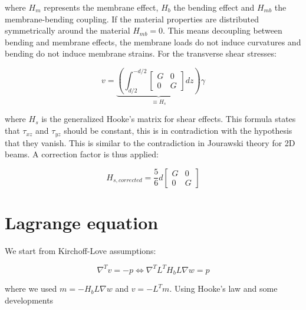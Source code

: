 	where $H_m$ represents the membrane effect, $H_b$ the bending effect and $H_{mb}$ the membrane-bending coupling. If the material properties are distributed symmetrically around the material $H_{mb} = 0$. This means decoupling between bending and membrane effects, the membrane loads do not induce curvatures and bending do not induce membrane strains. For the transverse shear stresses: 
	
	\begin{equation}
	v =\underbrace{\left( \int _{d/2} ^{-d/2} \left[
	\begin{array}{cc}
	G & 0\\
	0 & G
	\end{array}
	\right] dz\right)}_{\equiv H_s} \gamma
	\end{equation}
	
	where $H_s$ is the generalized Hooke's matrix for shear effects. This formula states that $\tau _{xz}$ and $\tau _{yz}$ should be constant, this is in contradiction with the hypothesis that they vanish. This is similar to the contradiction in Jourawski theory for 2D beams. A correction factor is thus applied: 
	
	\begin{equation}
	H_{s,corrected} = \frac{5}{6} d \left[
	\begin{array}{cc}
	G & 0\\
	0 & G
	\end{array}
	\right]
	\end{equation}
	
	\begin{center}
	\end{center}
	
\section{Lagrange equation}
	We start from Kirchoff-Love assumptions: 
	
	\begin{equation}
	\nabla ^T v = -p \Leftrightarrow \nabla ^T L^T H_b L \nabla w = p
	\end{equation}
	
	where we used $m = -H_b L \nabla w$ and $v = -L^T m$. Using Hooke's law and some developments
	
	\begin{center}
	\end{center}